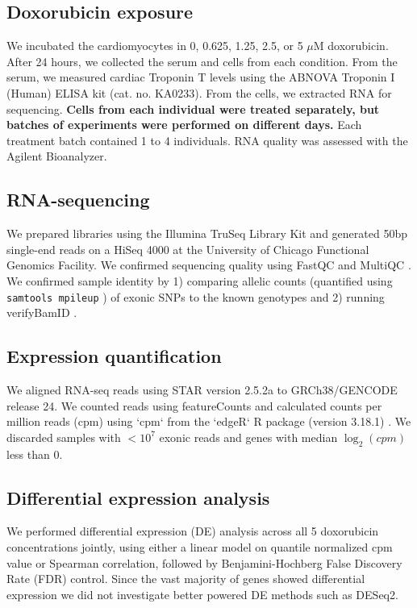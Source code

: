 \documentclass{article}
\newcommand{\tempbold}[1]{\textbf{#1}}
\begin{document}
\subsection*{Doxorubicin exposure}

We incubated the cardiomyocytes in 0, 0.625, 1.25, 2.5, or 5 $\mu$M
doxorubicin. After 24 hours, we collected the serum and cells from each
condition. From the serum, we measured cardiac Troponin T levels using the
ABNOVA Troponin I (Human) ELISA kit (cat. no. KA0233). From the cells, we
extracted RNA for sequencing. \tempbold{Cells from each individual were treated separately, but batches of experiments were performed on different days.} Each treatment batch contained 1 to 4
individuals. RNA quality was assessed with the Agilent Bioanalyzer.

\subsection*{RNA-sequencing}

We prepared libraries using the Illumina TruSeq Library Kit and
generated 50bp single-end reads on a HiSeq 4000 at the University of
Chicago Functional Genomics Facility. 
We confirmed sequencing quality using FastQC and MultiQC
\cite{Ewels2016}. We confirmed sample identity by 1) comparing
allelic counts (quantified using \texttt{samtools mpileup} \cite{li2009sequence}) of exonic SNPs to the known genotypes and 2) running
verifyBamID \cite{Jun2012}.

\subsection*{Expression quantification}

We aligned RNA-seq reads using STAR version 2.5.2a \cite{Dobin2013} to GRCh38/GENCODE release 24. We counted reads using featureCounts \cite{Liao2014} and calculated counts per million reads (cpm) using `cpm` from the `edgeR` R package (version 3.18.1) \cite{Robinson2010}. We discarded samples with $<10^7$ exonic reads and genes with median $\log_2(cpm)$ less than $0$.

\subsection*{Differential expression analysis} 

We performed differential expression (DE) analysis across all 5 doxorubicin concentrations jointly, using either a linear model on quantile normalized cpm value or Spearman correlation, followed by Benjamini-Hochberg False Discovery Rate (FDR) control. Since the vast majority of genes showed differential expression we did not investigate better powered DE methods such as DESeq2. 
\end{document}

